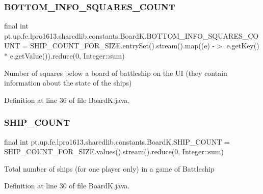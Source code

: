 \subsubsection{\texorpdfstring{B\+O\+T\+T\+O\+M\+\_\+\+I\+N\+F\+O\+\_\+\+S\+Q\+U\+A\+R\+E\+S\+\_\+\+C\+O\+U\+NT}{BOTTOM\_INFO\_SQUARES\_COUNT}}
{\footnotesize\ttfamily final int pt.\+up.\+fe.\+lpro1613.\+sharedlib.\+constants.\+Board\+K.\+B\+O\+T\+T\+O\+M\+\_\+\+I\+N\+F\+O\+\_\+\+S\+Q\+U\+A\+R\+E\+S\+\_\+\+C\+O\+U\+NT = S\+H\+I\+P\+\_\+\+C\+O\+U\+N\+T\+\_\+\+F\+O\+R\+\_\+\+S\+I\+Z\+E.\+entry\+Set().stream().map((e) -\/$>$ e.\+get\+Key() $\ast$ e.\+get\+Value()).reduce(0, Integer\+::sum)\hspace{0.3cm}{\ttfamily [static]}}

Number of squares below a board of battleship on the UI (they contain information about the state of the ships) 

Definition at line 36 of file Board\+K.\+java.

\hypertarget{classpt_1_1up_1_1fe_1_1lpro1613_1_1sharedlib_1_1constants_1_1_board_k_ae2fc4102eec84d733b9ca1136687284a}{}\label{classpt_1_1up_1_1fe_1_1lpro1613_1_1sharedlib_1_1constants_1_1_board_k_ae2fc4102eec84d733b9ca1136687284a} 
\subsubsection{\texorpdfstring{S\+H\+I\+P\+\_\+\+C\+O\+U\+NT}{SHIP\_COUNT}}
{\footnotesize\ttfamily final int pt.\+up.\+fe.\+lpro1613.\+sharedlib.\+constants.\+Board\+K.\+S\+H\+I\+P\+\_\+\+C\+O\+U\+NT = S\+H\+I\+P\+\_\+\+C\+O\+U\+N\+T\+\_\+\+F\+O\+R\+\_\+\+S\+I\+Z\+E.\+values().stream().reduce(0, Integer\+::sum)\hspace{0.3cm}{\ttfamily [static]}}

Total number of ships (for one player only) in a game of Battleship 

Definition at line 30 of file Board\+K.\+java.

\hypertarget{classpt_1_1up_1_1fe_1_1lpro1613_1_1sharedlib_1_1constants_1_1_board_k_af6ff24deb48459109356bdad0fca5e3b}{}\label{classpt_1_1up_1_1fe_1_1lpro1613_1_1sharedlib_1_1constants_1_1_board_k_af6ff24deb48459109356bdad0fca5e3b} 
